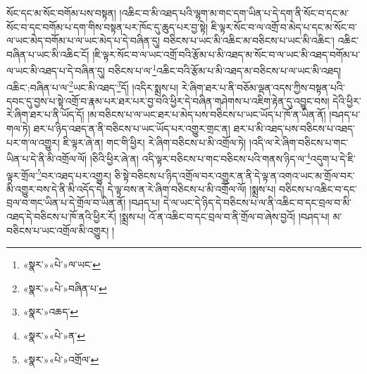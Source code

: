 སོང་དང་མ་སོང་བགོམ་པས་བསྟན། །འཆིང་བ་མི་འཐད་པའི་ལྷག་མ་གང་དག་ཡིན་པ་དེ་དག་ནི་སོང་བ་དང་མ་སོང་བ་དང་བགོམ་པ་དག་གིས་བསྟན་པར་ཁོང་དུ་ཆུད་པར་བྱ་སྟེ། ཇི་ལྟར་སོང་བ་ལ་འགྲོ་བ་མེད་པ་དང་མ་སོང་བ་ལ་ཡང་མེད་བགོམ་པ་ལ་ཡང་མེད་པ་དེ་བཞིན་དུ། བཅིངས་པ་ཡང་མི་འཆིང་མ་བཅིངས་པ་ཡང་མི་འཆིང་། འཆིང་བཞིན་པ་ཡང་མི་འཆིང་ངོ། །ཇི་ལྟར་སོང་བ་ལ་ཡང་འགྲོ་བའི་རྩོམ་པ་མི་འཐད་མ་སོང་བ་ལ་ཡང་མི་འཐད་བགོམ་པ་ལ་ཡང་མི་འཐད་པ་དེ་བཞིན་དུ། བཅིངས་པ་ལ་\footnote{«སྣར་»«པེ་»ལ་ཡང་}འཆིང་བའི་རྩོམ་པ་མི་འཐད་མ་བཅིངས་པ་ལ་ཡང་མི་འཐད། འཆིང་:བཞིན་པ་ལ་\footnote{«སྣར་»«པེ་»བཞིན་པ་}ཡང་མི་འཐད་\footnote{«སྣར་»འཆད་}དོ། །འདིར་སྨྲས་པ། རེ་ཞིག་ཐར་པ་ནི་བཅོམ་ལྡན་འདས་ཀྱིས་བསྟན་པའི་དབང་དུ་བྱས་པ་སྟེ་འགྲོ་བ་རྣམ་པར་ཐར་པར་བྱ་བའི་ཕྱིར་དེ་བཞིན་གཤེགས་པ་འཇིག་རྟེན་དུ་འབྱུང་བས། དེའི་ཕྱིར་རེ་ཞིག་ཐར་པ་ནི་ཡོད་དོ། །མ་བཅིངས་པ་ལ་ཡང་ཐར་པ་མེད་པས་བཅིངས་པ་ཡང་ཡོད་པ་ཁོ་ན་ཡིན་ནོ། །བཤད་པ་གལ་ཏེ། ཐར་པ་ཉིད་འཐད་ན་ནི་བཅིངས་པ་ཡང་ཡོད་པར་འགྱུར་གྲང་ན། ཐར་པ་མི་འཐད་པས་བཅིངས་པ་འཐད་པར་ག་ལ་འགྱུར། ཇི་ལྟར་ཞེ་ན། གང་གི་ཕྱིར། རེ་ཞིག་བཅིངས་པ་མི་འགྲོལ་ཏེ། །འདི་ལ་རེ་ཞིག་བཅིངས་པ་གང་ཡིན་པ་དེ་ནི་མི་འགྲོལ་ལོ། །ཅིའི་ཕྱིར་ཞེ་ན། འདི་ལྟར་བཅིངས་པ་གང་བཅིངས་པའི་གནས་ཉིད་ལ་\footnote{«སྣར་»«པེ་»ན་}འདུག་པ་དེ་ཇི་ལྟར་གྲོལ་\footnote{«སྣར་»«པེ་»འགྲོལ་}བར་འཐད་པར་འགྱུར། ཅི་སྟེ་བཅིངས་པ་ཉིད་འགྲོལ་བར་འགྱུར་ན་ནི་དེ་ལྟ་ན་འགའ་ཡང་མ་གྲོལ་བར་མི་འགྱུར་བས་དེ་ནི་མི་འདོད་དེ། དེ་ལྟ་བས་ན་རེ་ཞིག་བཅིངས་པ་མི་འགྲོལ་ལོ། །སྨྲས་པ། བཅིངས་པ་འཆིང་བ་དང་བྲལ་བ་གང་ཡིན་པ་དེ་གྲོལ་བ་ཡིན་ནོ། །བཤད་པ། དེ་ལ་ཡང་དེ་ཉིད་དེ་བཅིངས་པ་ལ་ནི་འཆིང་བ་དང་བྲལ་བ་མི་འཐད་དེ་བཅིངས་པ་ཁོ་ནའི་ཕྱིར་རོ། །སྨྲས་པ། འོ་ན་འཆིང་བ་དང་བྲལ་བ་ནི་གྲོལ་བ་ཞེས་བྱའོ། །བཤད་པ། མ་བཅིངས་པ་ཡང་འགྲོལ་མི་འགྱུར། །
